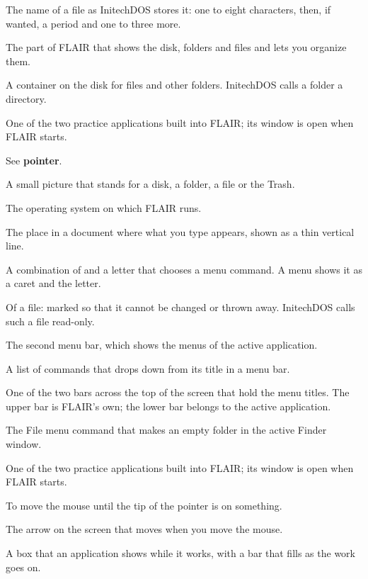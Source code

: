 The name of a file as InitechDOS stores it: one to
eight characters, then, if wanted, a period and one to three more.

The part of FLAIR that shows the disk, folders and
files and lets you organize them.

A container on the disk for files and other folders.
InitechDOS calls a folder a directory.

One of the two practice applications built into
FLAIR; its window is open when FLAIR starts.

See \textbf{pointer}.

A small picture that stands for a disk, a folder, a file
or the Trash.

The operating system on which FLAIR runs.

The place in a document where what you type
appears, shown as a thin vertical line.

A combination of  and a letter
that chooses a menu command.  A menu shows it as a caret and the letter.

Of a file: marked so that it cannot be changed or
thrown away.  InitechDOS calls such a file read-only.

The second menu bar, which shows the menus of
the active application.

A list of commands that drops down from its title in a
menu bar.

One of the two bars across the top of the screen
that hold the menu titles.  The upper bar is FLAIR's own; the lower bar
belongs to the active application.

The File menu command that makes an empty folder
in the active Finder window.

One of the two practice applications built into
FLAIR; its window is open when FLAIR starts.

To move the mouse until the tip of the pointer is on
something.

The arrow on the screen that moves when you move the
mouse.

A box that an application shows while it works,
with a bar that fills as the work goes on.

